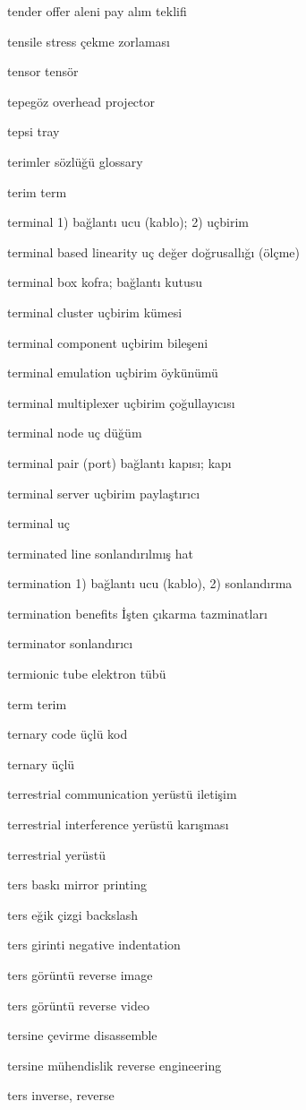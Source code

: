 \documentclass[12pt,fleqn]{article}\usepackage{../../common}
\begin{document}
tender offer aleni pay alım teklifi

tensile stress çekme zorlaması

tensor tensör

tepegöz overhead projector

tepsi tray

terimler sözlüğü glossary

terim term

terminal 1) bağlantı ucu (kablo); 2) uçbirim

terminal based linearity uç değer doğrusallığı (ölçme)

terminal box kofra; bağlantı kutusu

terminal cluster uçbirim kümesi

terminal component uçbirim bileşeni

terminal emulation uçbirim öykünümü

terminal multiplexer uçbirim çoğullayıcısı

terminal node uç düğüm

terminal pair (port) bağlantı kapısı; kapı

terminal server uçbirim paylaştırıcı

terminal uç

terminated line sonlandırılmış hat

termination 1) bağlantı ucu (kablo), 2) sonlandırma

termination benefits İşten çıkarma tazminatları

terminator sonlandırıcı

termionic tube elektron tübü

term terim

ternary code üçlü kod

ternary üçlü

terrestrial communication yerüstü iletişim

terrestrial interference yerüstü karışması

terrestrial yerüstü

ters baskı mirror printing

ters eğik çizgi backslash

ters girinti negative indentation

ters görüntü reverse image

ters görüntü reverse video

tersine çevirme disassemble

tersine mühendislik reverse engineering

ters inverse, reverse
\end{document}

